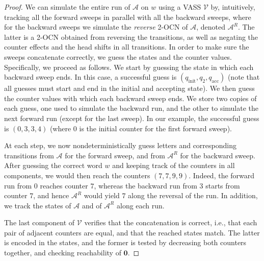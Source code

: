 \documentclass[11pt,a4paper]{amsart}
\theoremstyle{definition}
\newcommand{\initstate}{q_{\mathrm{init}}}
\newcommand{\accstate}{q_{\mathrm{acc}}}
\renewcommand{\vec}[1]{\boldsymbol{#1}}
\newcommand{\cA}{\mathcal{A}}
\newcommand{\cV}{\mathcal{V}}
\begin{document}
\begin{proof}
	We can simulate the entire run of $\cA$ on $w$ using a VASS $\cV$ by,
	intuitively, tracking all the forward sweeps in parallel with all the backward
	sweeps, where for the backward sweeps we simulate the \emph{reverse} 2-OCN of
	$\cA$, denoted $\cA^R$. The latter is a 2-OCN obtained from reversing the
	transitions, as well as negating the counter effects and the head shifts in all
	transitions.  In order to make sure the sweeps concatenate correctly, we guess
	the states and the counter values. Specifically, we proceed as follows.  We
	start by guessing the state in which each backward sweep ends. In this case, a
	successful guess is $(\initstate,q_2,\accstate)$ (note that all guesses must
	start and end in the initial and accepting state). We then guess the counter
	values with which each backward sweep ends. We store two copies of each guess,
	one used to simulate the backward run, and the other to simulate the next
	forward run (except for the last sweep). In our example, the successful guess is
	$(0,3,3,4)$ (where $0$ is the initial counter for the first forward sweep).
	
	At each step, we now nondeterministically guess letters and corresponding
	transitions from $\cA$ for the forward sweep, and from $\cA^R$ for the backward
	sweep. After guessing the correct word $w$ and keeping track of the counters in
	all components, we would then reach the counters $(7,7,9,9)$. Indeed, the
	forward run from $0$ reaches counter $7$, whereas the backward run from $3$
	starts from counter $7$, and hence $\cA^R$ would yield $7$ along the reversal of
	the run. In addition, we track the states of $\cA$ and of $\cA^R$ along each
	run.
	
	The last component of $\cV$ verifies that the concatenation is correct,
	i.e., that each pair of adjacent counters are equal, and that the reached states
	match. The latter is encoded in the states, and the former is tested by
	decreasing both counters together, and checking reachability of $\vec{0}$.
	

\end{proof}
\end{document}
